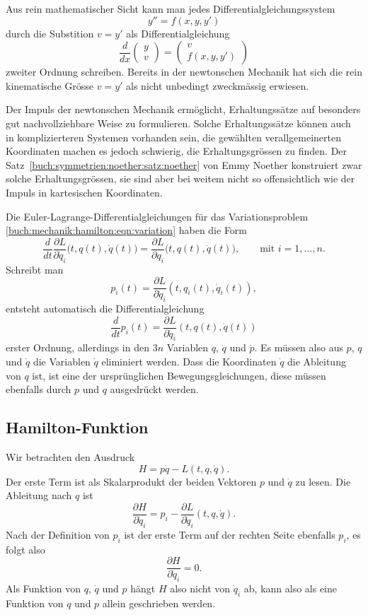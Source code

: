 Aus rein mathematischer Sicht kann man jedes Differentialgleichungssystem
\[
y'' = f(x,y,y')
\]
durch die Substition $v=y'$ als Differentialgleichung
\[
\frac{d}{dx}
\begin{pmatrix}
y\\ v
\end{pmatrix}
=
\begin{pmatrix}
v\\
f(x,y,y')
\end{pmatrix}
\]
zweiter Ordnung schreiben.
Bereits in der newtonschen Mechanik hat sich die rein kinematische
Grösse $v=y'$ als nicht unbedingt zweckmässig erwiesen.

Der Impuls der newtonschen Mechanik ermöglicht, Erhaltungssätze auf besonders
gut nachvollziehbare Weise zu formulieren.
%
Solche Erhaltungssätze können auch in komplizierteren Systemen
vorhanden sein, die gewählten verallgemeinerten Koordinaten machen
es jedoch schwierig, die Erhaltungsgrössen zu finden.
Der Satz~\ref{buch:symmetrien:noether:satz:noether} von Emmy Noether
konstruiert zwar solche Erhaltungsgrössen, sie sind aber bei weitem nicht
so offensichtlich wie der Impuls in kartesischen Koordinaten.

Die Euler-Lagrange-Differentialgleichungen für das Variationsproblem
\eqref{buch:mechanik:hamilton:eqn:variation} haben die Form
\[
\frac{d}{dt}
\frac{\partial L}{\partial \dot{q}_i}\bigl(t,q(t),\dot{q}(t)\bigr)
=
\frac{\partial L}{\partial q_i}\bigl(t,q(t),\dot{q}(t)\bigr),\qquad
\text{mit $i=1,\dots,n$}.
\]
Schreibt man
\[
p_i(t)
= 
\frac{\partial L}{\partial \dot{q}_i}(t,q_i(t),\dot{q}_i(t)),
\]
entsteht automatisch die Differentialgleichung
\[
\frac{d}{dt} p_i(t)
=
\frac{\partial L}{\partial \dot{q}_i}(t,q(t),\dot{q}(t))
\]
erster
Ordnung, allerdings in den $3n$ Variablen $q$, $\dot{q}$ und
$\dot{p}$.
Es müssen also aus $p$, $q$ und $\dot{q}$ die Variablen $\dot{q}$
eliminiert werden.
Dass die Koordinaten $\dot{q}$ die Ableitung von $q$ ist, ist eine
der ursprünglichen Bewegungsgleichungen, diese müssen ebenfalls durch
$p$ und $q$ ausgedrückt werden.

%
%
\subsection{Hamilton-Funktion}
Wir betrachten den Ausdruck
\[
H
=
p\dot{q}
-
L(t,q,\dot{q}).
\]
Der erste Term ist als Skalarprodukt der beiden Vektoren $p$ und $\dot{q}$
zu lesen.
Die Ableitung nach $q$ ist
\[
\frac{\partial H}{\partial \dot{q}_i}
=
p_i
-
\frac{\partial L}{\partial \dot{q}_i}(t,q,\dot{q}).
\]
Nach der Definition von $p_i$ ist der erste Term auf der rechten Seite
ebenfalls $p_i$, es folgt also
\[
\frac{\partial H}{\partial \dot{q}_i} = 0.
\]
Als Funktion von $q$, $\dot{q}$ und $p$ hängt $H$ also nicht von $\dot{q}_i$
ab, kann also als eine Funktion von $q$ und $p$ allein geschrieben werden.

